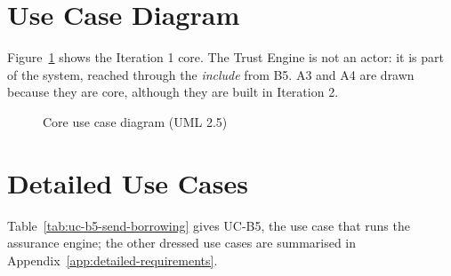 \section{Use Case Diagram}\label{sec:use-case-diagram}
Figure~\ref{fig:core-use-case-diagram} shows the Iteration 1 core. The Trust Engine is not an actor: it is part of the system, reached through the \textit{include} from B5. A3 and A4 are drawn because they are core, although they are built in Iteration 2.

\begin{figure}[htbp]
\centering

\caption{Core use case diagram (UML 2.5)}\label{fig:core-use-case-diagram}
\end{figure}
\section{Detailed Use Cases}\label{sec:detailed-use-cases}
Table~\ref{tab:uc-b5-send-borrowing} gives UC-B5, the use case that runs the assurance engine; the other dressed use cases are summarised in Appendix~\ref{app:detailed-requirements}.

